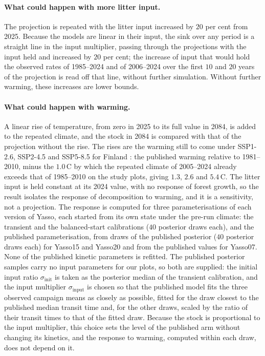\documentclass[11pt]{article}
\newcommand{\sinput}{\sigma_{\mathrm{input}}}
\newcommand{\sinit}{\sigma_{\mathrm{init}}}
\begin{document}
\paragraph{What could happen with more litter input.} The projection is repeated with the litter input increased by $20$
per cent from 2025. Because the models are linear in their input, the sink over any period is a straight line in the
input multiplier, passing through the projections with the input held and increased by $20$ per
cent; the increase of input that would hold the observed rates of 1985--2024 and of 2006--2024
over the first $10$ and $20$ years of the projection is read off that line, without further
simulation. Without further warming, these increases are lower bounds.

\paragraph{What could happen with warming.} A linear rise of temperature, from zero in 2025 to its full value in 2084, is
added to the repeated climate, and the stock in 2084 is compared with that of the projection
without the rise. The rises are the warming still to come under SSP1-2.6, SSP2-4.5 and SSP5-8.5 for Finland \citep{RuosteenojaJylha2021}: the published warming relative to 1981--2010, minus the $1.0$\,\textdegree C by which the repeated climate of 2005--2024 already exceeds that of 1985--2010 on the study plots, giving $1.3$, $2.6$ and $5.4$\,\textdegree C.
 The litter input is held constant at its
2024 value, with no response of forest growth, so the result isolates the response of
decomposition to warming, and it is a sensitivity, not a projection. The
response is computed for three parameterisations of each version of Yasso, each started from its
own state under the pre-run climate: the transient and the balanced-start calibrations ($40$ posterior draws each), and the published parameterisation, from draws of the published posterior ($40$ posterior draws each)
for Yasso15 and Yasso20 and from the published values for Yasso07. None of the published kinetic parameters is
refitted. The published posterior samples carry no input parameters for our plots, so both are supplied: the initial input ratio $\sinit$ is taken as the posterior median of the transient calibration, and the input multiplier $\sinput$ is chosen so that the published model fits the three observed campaign means as closely as possible, fitted for the draw closest to the published median transit time and, for the other draws, scaled by the ratio of their transit times to that of the fitted draw. Because the stock is proportional to the input multiplier, this choice sets the level of the published arm without changing its kinetics, and the response to warming, computed within each draw, does not depend on it.
\end{document}
